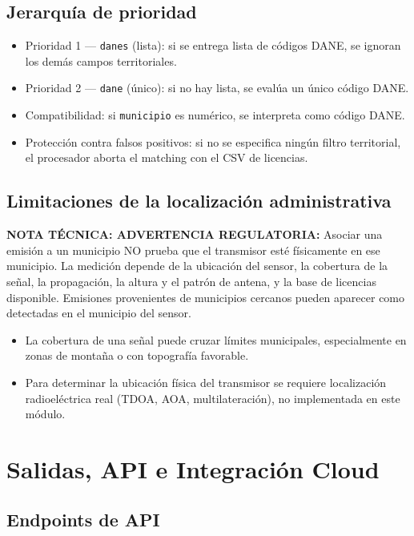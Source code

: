 \subsection{Jerarquía de prioridad}

\begin{itemize}
\item Prioridad 1 — \texttt{danes} (lista): si se entrega lista de códigos DANE, se ignoran los demás campos territoriales.
\item Prioridad 2 — \texttt{dane} (único): si no hay lista, se evalúa un único código DANE.
\item Compatibilidad: si \texttt{municipio} es numérico, se interpreta como código DANE.
\item Protección contra falsos positivos: si no se especifica ningún filtro territorial, el procesador aborta el matching con el CSV de licencias.
\end{itemize}

\subsection{Limitaciones de la localización administrativa}

\textbf{NOTA TÉCNICA: ADVERTENCIA REGULATORIA:} Asociar una emisión a un municipio NO prueba que el transmisor esté físicamente en ese municipio. La medición depende de la ubicación del sensor, la cobertura de la señal, la propagación, la altura y el patrón de antena, y la base de licencias disponible. Emisiones provenientes de municipios cercanos pueden aparecer como detectadas en el municipio del sensor.

\begin{itemize}
\item La cobertura de una señal puede cruzar límites municipales, especialmente en zonas de montaña o con topografía favorable.
\item Para determinar la ubicación física del transmisor se requiere localización radioeléctrica real (TDOA, AOA, multilateración), no implementada en este módulo.
\end{itemize}

\section{Salidas, API e Integración Cloud}

\subsection{Endpoints de API}

